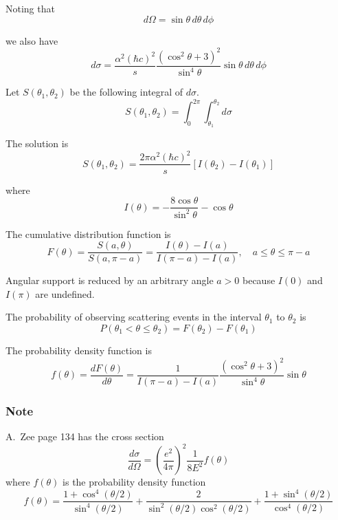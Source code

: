 Noting that
\begin{equation*}
d\Omega=\sin\theta\,d\theta\,d\phi
\end{equation*}

we also have
\begin{equation*}
d\sigma=\frac{\alpha^2(\hbar c)^2}{s}
\frac{(\cos^2\theta+3)^2}{\sin^4\theta}
\sin\theta\,d\theta\,d\phi
\end{equation*}

Let $S(\theta_1,\theta_2)$ be the following integral of $d\sigma$.
\begin{equation*}
S(\theta_1,\theta_2)=\int_0^{2\pi}\int_{\theta_1}^{\theta_2}d\sigma
\end{equation*}

The solution is
\begin{equation*}
S(\theta_1,\theta_2)=\frac{2\pi\alpha^2(\hbar c)^2}{s}[I(\theta_2)-I(\theta_1)]
\end{equation*}

where
\begin{equation*}
I(\theta)=-\frac{8\cos\theta}{\sin^2\theta}-\cos\theta
\end{equation*}

The cumulative distribution function is
\begin{equation*}
F(\theta)
=\frac{S(a,\theta)}{S(a,\pi-a)}
=\frac{I(\theta)-I(a)}{I(\pi-a)-I(a)},
\quad
a\le\theta\le\pi-a
\end{equation*}

Angular support is reduced by an arbitrary angle $a>0$ because $I(0)$ and $I(\pi)$ are undefined.

\bigskip
The probability of observing scattering events in the interval $\theta_1$ to $\theta_2$ is
\begin{equation*}
P(\theta_1<\theta\le\theta_2)=F(\theta_2)-F(\theta_1)
\end{equation*}

The probability density function is
\begin{equation*}
f(\theta)=\frac{dF(\theta)}{d\theta}
=\frac{1}{I(\pi-a)-I(a)}
\frac{\left(\cos^2\theta+3\right)^2}{\sin^4\theta}\sin\theta
\end{equation*}

\subsubsection*{Note}

A.~Zee page 134 has the cross section
\begin{equation*}
\frac{d\sigma}{d\Omega}=\left(\frac{e^2}{4\pi}\right)^2\frac{1}{8E^2}f(\theta)
\end{equation*}
where $f(\theta)$ is the probability density function
\begin{equation*}
f(\theta)=
\frac{1+\cos^4(\theta/2)}{\sin^4(\theta/2)}
+\frac{2}{\sin^2(\theta/2)\cos^2(\theta/2)}
+\frac{1+\sin^4(\theta/2)}{\cos^4(\theta/2)}
\end{equation*}

